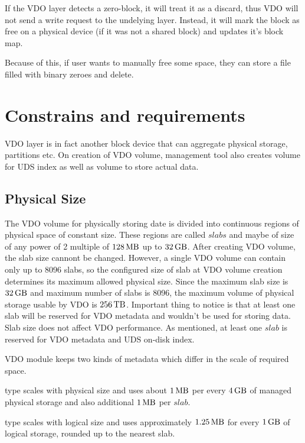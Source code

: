 \documentclass[
  color, %
  table, %
  lof,   %
  lot,   %
]{fithesis3}
\begin{document}
If the VDO layer detects a zero-block, it will treat it as a discard, thus VDO will not send a write request to the undelying layer. Instead, it will mark the block as free on a physical device (if it was not a shared block) and updates it's block map.

Because of this, if user wants to manually free some space, they can store a file filled with binary zeroes and delete.


\section{Constrains and requirements}
VDO layer is in fact another block device that can aggregate physical storage, partitions etc. On creation of VDO volume, management tool also creates volume for UDS index as well as volume to store actual data.

\subsection{Physical Size}
The VDO volume for physically storing date is divided into continuous regions of physical space of constant size. These regions are called $slabs$ and maybe of size of any power of 2 multiple of $\SI{128}{\mega\byte}$  up to $\SI{32}{\giga\byte}$. After creating VDO volume, the slab size cannont be changed. However, a single VDO volume can contain only up to 8096 slabs, so the configured size of slab at VDO volume creation determines its maximum allowed physical size. Since the maximum slab size is $\SI{32}{\giga\byte}$ and maximum number of slabs is 8096, the maximum volume of physical storage usable by VDO is $\SI{256}{\tera\byte}$. Important thing to notice is that at least one slab will be reserved for VDO metadata and wouldn't be used for storing data. Slab size does not affect VDO performance. As mentioned, at least one $slab$ is reserved for VDO metadata and UDS on-disk index.

VDO module keeps two kinds of metadata which differ in the scale of required space.
\begin{compactenum}
\item type scales with physical size and uses about $\SI{1}{\mega\byte}$ per every $\SI{4}{\giga\byte}$ of managed physical storage and also additional $\SI{1}{\mega\byte}$ per $slab$. 
\item type scales with logical size and uses approximately $\SI{1.25}{\mega\byte}$ for every $\SI{1}{\giga\byte}$ of logical storage, rounded up to the nearest slab.
\end{compactenum}
\end{document}

